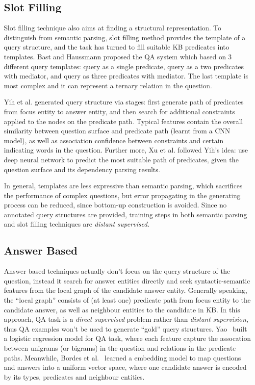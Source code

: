 \subsection{Slot Filling}

Slot filling technique also aims at finding a structural representation.
To distinguish from semantic parsing, slot filling method provides the template of a query structure,
and the task has turned to fill suitable KB predicates into templates.
Bast and Haussmann  proposed the QA system which based on 3 different query templates:
query as a single predicate, query as a two predicates with mediator, and query as three predicates with mediator.
The last template is most complex and it can represent a ternary relation in the question.

Yih et al.  generated query structure via stages: first generate path of predicates
from focus entity to answer entity,
and then search for additional constraints applied to the nodes on the predicate path.
Typical features contain the overall similarity between question surface and predicate path (learnt from a CNN model),
as well as association confidence between constraints and certain indicating words in the question.
Further more, Xu et al.  followed Yih's idea: use deep neural network to predict the most suitable
path of predicates, given the question surface and its dependency parsing results.

In general, templates are less expressive than semantic parsing, which sacrifices the performance of complex questions, but error propagating in the generating process can be reduced, since bottom-up construction is avoided.
Since no annotated query structures are provided, training steps in both semantic parsing and slot filling techniques are \textit{distant supervised}.




\subsection{Answer Based}

Answer based techniques actually don't focus on the query structure of the question,
instead it search for answer entities directly and seek syntactic-semantic features
from the local graph of the candidate answer entity.
Generally speaking, the ``local graph'' consists of (at least one) predicate path
from focus entity to the candidate answer, as well as neighbour entities to the candidate in KB.
In this approach, QA task is a \textit{direct supervised} problem
rather than \textit{distant supervision}, 
thus QA examples won't be used to generate ``gold'' query structures.
Yao~ built a logistic regression model for QA task, where each feature
capture the assocation between unigrams (or bigrams) in the question and relations in the predicate paths.
Meanwhile, Bordes et al.~ learned a embedding model to map questions and answers
into a uniform vector space, where one candidate answer is encoded by its types, predicates and neighbour entities.



